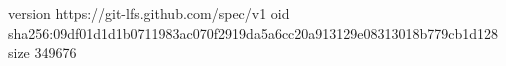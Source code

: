 version https://git-lfs.github.com/spec/v1
oid sha256:09df01d1d1b0711983ac070f2919da5a6cc20a913129e08313018b779cb1d128
size 349676
